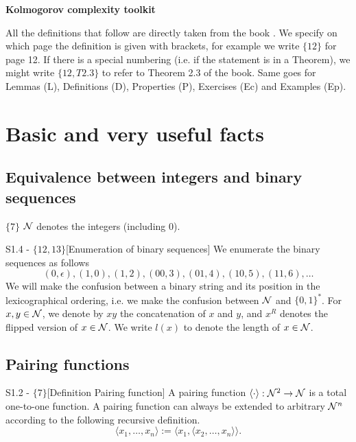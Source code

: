 \documentclass{article}
\begin{document}
\begin{center}
    \textbf{Kolmogorov complexity toolkit}
\end{center}

All the definitions that follow are directly taken from the book \cite{li2008kolmogorov}. We specify on which page the definition is given with brackets, for example we write $\{12\}$ for page 12. If there is a special numbering (i.e. if the statement is in a Theorem), we might write $\{12, T2.3\}$ to refer to Theorem 2.3 of the book. Same goes for Lemmas (L), Definitions (D), Properties (P), Exercises (Ec) and Examples (Ep).

\section{Basic and very useful facts}

\subsection{Equivalence between integers and binary sequences}

 $\{7\}$ $\mathcal{N}$ denotes the integers (including 0). 
 
 \begin{flexidefinition}{S1.4 - $\{12,13\}$}[Enumeration of binary sequences]
    We enumerate the binary sequences as follows
\begin{equation}
    (0,\epsilon), (1,0), (1,2), (00,3), (01,4) , (10,5), (11,6), \ldots
\end{equation}
We will make the confusion between a binary string and its position in the lexicographical ordering, i.e. we make the confusion between $\mathcal{N}$ and $\{0,1\}^\ast$. For $x,y \in \mathcal{N}$, we denote by $xy$ the concatenation of $x$ and $y$, and $x^R$ denotes the flipped version of $x \in \mathcal{N}$. We write $l(x)$ to denote the length of $x \in \mathcal{N}$.
 \end{flexidefinition}
 

\subsection{Pairing functions}

\begin{flexidefinition}{S1.2 - $\{7\}$}[Definition Pairing function]
    A pairing function $\langle \cdot \rangle: \mathcal{N}^2 \to \mathcal{N}$ is a total one-to-one function. A pairing function can always be extended to arbitrary $\mathcal{N}^n$ according to the following recursive definition.
    \begin{equation}
        \langle x_1, \ldots, x_n \rangle := \langle x_1, \langle x_2, \ldots, x_{n} \rangle \rangle.
    \end{equation}
\end{flexidefinition}
\end{document}
